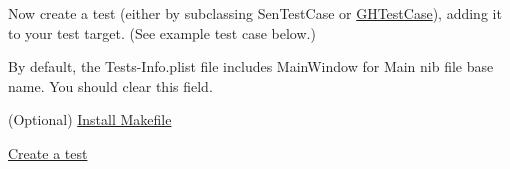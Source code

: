 \begin{DoxyItemize}
\item \-Now create a test (either by subclassing {\ttfamily \-Sen\-Test\-Case} or {\ttfamily \hyperlink{interface_g_h_test_case}{\-G\-H\-Test\-Case}}), adding it to your test target. (\-See example test case below.)
\item \-By default, the \-Tests-\/\-Info.\-plist file includes {\ttfamily \-Main\-Window} for {\ttfamily \-Main nib file base name}. \-You should clear this field.
\item (\-Optional) \hyperlink{_command_line_Makefile}{\-Install \-Makefile}
\item \hyperlink{_examples}{\-Create a test} 
\end{DoxyItemize}